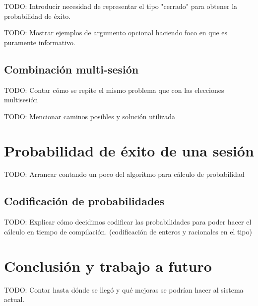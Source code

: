 \begin{frame}{\insertsection}
	TODO: Introducir necesidad de representar el tipo "cerrado" para obtener la probabilidad de éxito. 
\end{frame}

\begin{frame}{\insertsection}
	TODO: Mostrar ejemplos de argumento opcional haciendo foco en que es puramente informativo.
\end{frame}

\subsection{Combinación multi-sesión}

\begin{frame}{\insertsubsection}
	TODO: Contar cómo se repite el mismo problema que con las elecciones multisesión
\end{frame}

\begin{frame}{\insertsubsection}
	TODO: Mencionar caminos posibles y solución utilizada
\end{frame}

\section{Probabilidad de éxito de una sesión}
\begin{frame}{\insertsection}
	TODO: Arrancar contando un poco del algoritmo para cálculo de probabilidad
\end{frame}

\subsection{Codificación de probabilidades}
\begin{frame}{\insertsubsection}
	TODO: Explicar cómo decidimos codificar las probabilidades para poder hacer el cálculo en tiempo de compilación. (codificación de enteros y racionales en el tipo)
\end{frame}

\section{Conclusión y trabajo a futuro}
\begin{frame}{\insertsection}
	TODO: Contar hasta dónde se llegó y qué mejoras se podrían hacer al sistema actual.
\end{frame}
